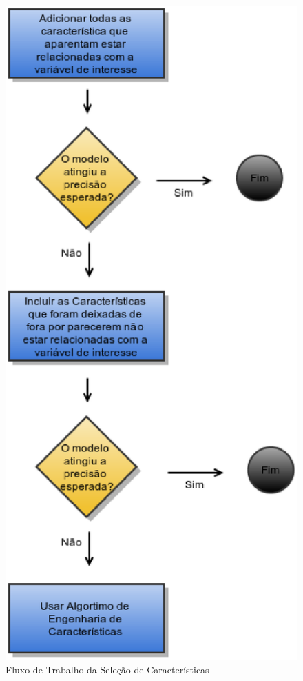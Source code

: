 \begin{figure}[!h]
\centering
\includegraphics[keepaspectratio=true,scale=0.5]
{figuras/data_workflow.eps}
\caption{Fluxo de Trabalho da Seleção de Características}
\label{workflow_data}
\end{figure}

